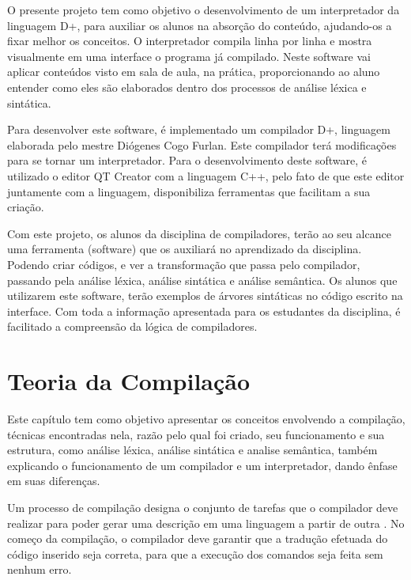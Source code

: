 \documentclass[12pt,oneside,a4paper,chapter=TITLE,section=TITLE,sumario=tradicional]{abntex2}
\begin{document}
O presente projeto tem como objetivo o desenvolvimento de um interpretador da linguagem D+, para auxiliar os alunos na absorção do conteúdo, ajudando-os a fixar melhor os conceitos. O interpretador compila linha por linha e mostra visualmente em uma interface o programa já compilado. Neste software vai aplicar conteúdos visto em sala de aula, na prática, proporcionando ao aluno entender como eles são elaborados dentro dos processos de análise léxica e sintática.

Para desenvolver este software, é implementado um compilador D+, linguagem elaborada pelo mestre Diógenes Cogo Furlan. Este compilador terá modificações para se tornar um interpretador. Para o desenvolvimento deste software, é utilizado o editor QT Creator com a linguagem C++, pelo fato de que este editor juntamente com a linguagem, disponibiliza ferramentas que facilitam a sua criação.

Com este projeto, os alunos da disciplina de compiladores, terão ao seu alcance uma ferramenta (software) que os auxiliará no aprendizado da disciplina. Podendo criar códigos, e ver a transformação que passa pelo compilador, passando pela análise léxica, análise sintática e análise semântica. Os alunos que utilizarem este software, terão exemplos de árvores sintáticas no código escrito na interface. Com toda a informação apresentada para os estudantes da disciplina, é facilitado a compreensão da lógica de compiladores.

\chapter{Teoria da Compilação}
\label{cap:teoria-da-compilação}

Este capítulo tem como objetivo apresentar os conceitos envolvendo a compilação, técnicas encontradas nela, razão pelo qual foi criado, seu funcionamento e sua estrutura, como análise léxica, análise sintática e analise semântica, também explicando o funcionamento de um compilador e um interpretador, dando ênfase em suas diferenças.

Um processo de compilação designa o conjunto de tarefas que o compilador deve realizar para poder gerar uma descrição em uma linguagem a partir de outra \cite{pedro2018}. No começo da compilação, o compilador deve garantir que a tradução efetuada do código inserido seja correta, para que a execução dos comandos seja feita sem nenhum erro.
\end{document}
